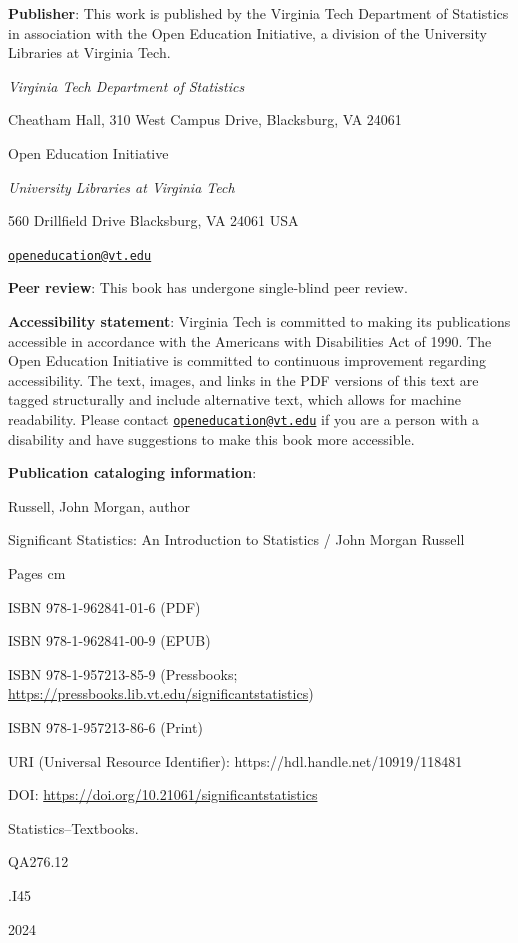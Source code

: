 \documentclass[
  letterpaper,
  DIV=11,
  numbers=noendperiod]{scrreprt}
\begin{document}
\textbf{Publisher}: This work is published by the Virginia Tech
Department of Statistics in association with the Open Education
Initiative, a division of the University Libraries at Virginia Tech.

\emph{Virginia Tech Department of Statistics}

Cheatham Hall, 310 West Campus Drive, Blacksburg, VA 24061

Open Education Initiative

\emph{University Libraries at Virginia Tech}

560 Drillfield Drive Blacksburg, VA 24061 USA

\href{mailto:openeducation@vt.edu}{\nolinkurl{openeducation@vt.edu}}

\textbf{Peer review}: This book has undergone single-blind peer review.

\textbf{Accessibility statement}: Virginia Tech is committed to making
its publications accessible in accordance with the Americans with
Disabilities Act of 1990. The Open Education Initiative is committed to
continuous improvement regarding accessibility. The text, images, and
links in the PDF versions of this text are tagged structurally and
include alternative text, which allows for machine readability. Please
contact
\href{mailto:openeducation@vt.edu}{\nolinkurl{openeducation@vt.edu}} if
you are a person with a disability and have suggestions to make this
book more accessible.

\textbf{Publication cataloging information}:

Russell, John Morgan, author

Significant Statistics: An Introduction to Statistics / John Morgan
Russell

Pages cm

ISBN 978-1-962841-01-6 (PDF)

ISBN 978-1-962841-00-9 (EPUB)

ISBN 978-1-957213-85-9 (Pressbooks;
\url{https://pressbooks.lib.vt.edu/significantstatistics})

ISBN 978-1-957213-86-6 (Print)

URI (Universal Resource Identifier): https://hdl.handle.net/10919/118481

DOI: \url{https://doi.org/10.21061/significantstatistics}

Statistics--Textbooks.

QA276.12

.I45

2024
\end{document}
